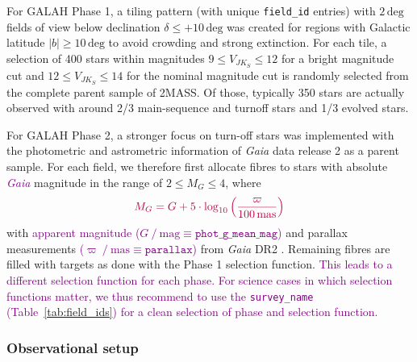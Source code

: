 \documentclass[
  journal=pasa,
  manuscript=research-paper, %
  year=2024,
  volume=37
]{cup-journal}
\newcommand{\adjusted}[1]{{\textcolor{purple}{#1}}}
\newcommand{\Gaia}{\textit{Gaia}\xspace}
\begin{document}
For GALAH Phase 1, a tiling pattern (with unique \texttt{field\_id} entries) with $2\,\mathrm{deg}$ fields of view below declination $\delta \leq +10\,\mathrm{deg}$ was created for regions with Galactic latitude $\vert b \vert \geq 10\,\mathrm{deg}$ to avoid crowding and strong extinction. For each tile, a selection of 400 stars within magnitudes $9 \leq V_{JK_S} \leq 12$ for a bright magnitude cut and $12 \leq V_{JK_S} \leq 14$ for the nominal magnitude cut is randomly selected from the complete parent sample of 2MASS. Of those, typically 350 stars are actually observed with around 2/3 main-sequence and turnoff stars and 1/3 evolved stars.

For GALAH Phase 2, a stronger focus on turn-off stars was implemented with the photometric and astrometric information of \Gaia data release 2 as a parent sample. For each field, we therefore first allocate fibres to stars with absolute \adjusted{\Gaia} magnitude in the range of $2 \leq M_G \leq 4$, where
\begin{equation}
\adjusted{M_G = G + 5 \cdot \log_{10} \left( \frac{\varpi}{100\,\mathrm{mas}} \right)}
\end{equation}
with \adjusted{apparent magnitude ($G~/~\mathrm{mag} \equiv \texttt{phot\_g\_mean\_mag}$)} and parallax measurements \adjusted{($\varpi~/~\mathrm{mas} \equiv \texttt{parallax}$)} from \Gaia DR2 \citep{Brown2018, Evans2018, Lindegren2018}. Remaining fibres are filled with targets as done with the Phase 1 selection function. \adjusted{This leads to a different selection function for each phase. For science cases in which selection functions matter, we thus recommend to use the \texttt{survey\_name} (Table~\ref{tab:field_ids}) for a clean selection of phase and selection function.}

\subsubsection{Observational setup}
\end{document}
